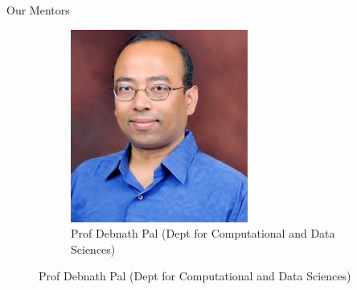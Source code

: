 \begin{frame}{Our Mentors}
\begin{figure}[h]
\begin{subfigure}[b]{0.3\textwidth}
            \includegraphics[width=\textwidth]{images/debnath.png}
            \caption{Prof Debnath Pal (Dept for Computational and Data Sciences)}
            \label{fig:image2}
        \end{subfigure}
    \end{figure}
\end{frame}